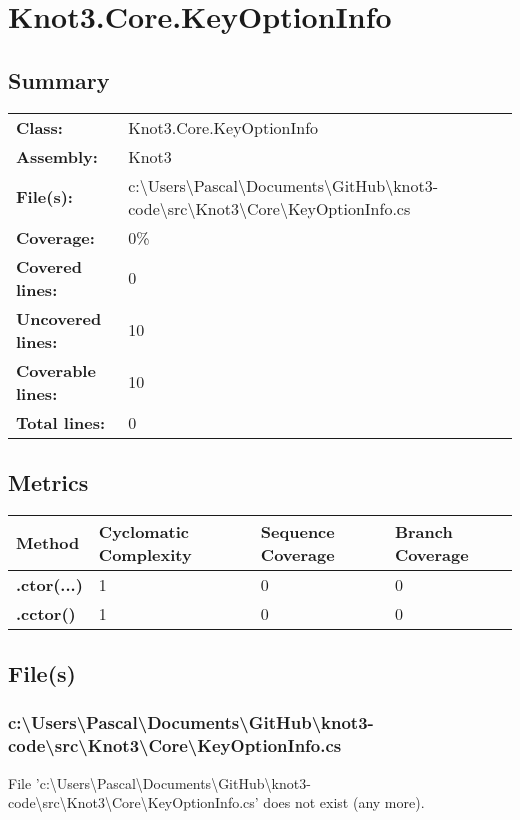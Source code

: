 \documentclass[a4paper,10pt]{article}
\begin{document}
\section{Knot3.Core.KeyOptionInfo}
\subsection{Summary}
\begin{longtable}[l]{ll}
\textbf{Class:} & Knot3.Core.KeyOptionInfo\\
\textbf{Assembly:} & Knot3\\
\textbf{File(s):} & \begin{minipage}[t]{12cm}{c:\textbackslash Users\textbackslash Pascal\textbackslash Documents\textbackslash GitHub\textbackslash knot3-code\textbackslash src\textbackslash Knot3\textbackslash Core\textbackslash KeyOptionInfo.cs}\end{minipage} \\
\textbf{Coverage:} & 0\%\\
\textbf{Covered lines:} & 0\\
\textbf{Uncovered lines:} & 10\\
\textbf{Coverable lines:} & 10\\
\textbf{Total lines:} & 0\\
\end{longtable}
\subsection{Metrics}
\begin{longtable}[l]{|l|l|l|l|}
\hline
\textbf{Method} & \textbf{Cyclomatic Complexity} & \textbf{Sequence Coverage} & \textbf{Branch Coverage}\\
\hline
\textbf{.ctor(...)} & 1 & 0 & 0\\
\hline
\textbf{.cctor()} & 1 & 0 & 0\\
\hline
\end{longtable}
\subsection{File(s)}
\subsubsection{c:\textbackslash Users\textbackslash Pascal\textbackslash Documents\textbackslash GitHub\textbackslash knot3-code\textbackslash src\textbackslash Knot3\textbackslash Core\textbackslash KeyOptionInfo.cs}
 File 'c:\textbackslash Users\textbackslash Pascal\textbackslash Documents\textbackslash GitHub\textbackslash knot3-code\textbackslash src\textbackslash Knot3\textbackslash Core\textbackslash KeyOptionInfo.cs' does not exist (any more).
\newpage
\end{document}
